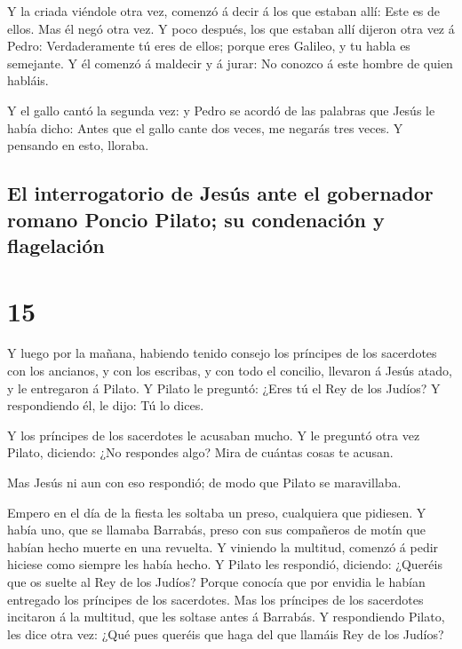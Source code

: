  Y la criada viéndole otra vez, comenzó á decir á los que
estaban allí: Este es de ellos.  Mas él negó otra vez. Y
poco después, los que estaban allí dijeron otra vez á Pedro:
Verdaderamente tú eres de ellos; porque eres Galileo, y tu habla es
semejante.  Y él comenzó á maldecir y á jurar: No conozco
á este hombre de quien habláis.

 Y el gallo cantó la segunda vez: y Pedro se acordó de
las palabras que Jesús le había dicho: Antes que el gallo cante dos
veces, me negarás tres veces. Y pensando en esto, lloraba.

\hypertarget{el-interrogatorio-de-jesuxfas-ante-el-gobernador-romano-poncio-pilato-su-condenaciuxf3n-y-flagelaciuxf3n}{%
\subsection{El interrogatorio de Jesús ante el gobernador romano Poncio
Pilato; su condenación y
flagelación}\label{el-interrogatorio-de-jesuxfas-ante-el-gobernador-romano-poncio-pilato-su-condenaciuxf3n-y-flagelaciuxf3n}}

\hypertarget{section-41-15}{%
\section{15}\label{section-41-15}}

 Y luego por la mañana, habiendo tenido consejo los
príncipes de los sacerdotes con los ancianos, y con los escribas, y con
todo el concilio, llevaron á Jesús atado, y le entregaron á Pilato.
 Y Pilato le preguntó: ¿Eres tú el Rey de los Judíos? Y
respondiendo él, le dijo: Tú lo dices.

 Y los príncipes de los sacerdotes le acusaban mucho.
 Y le preguntó otra vez Pilato, diciendo: ¿No respondes
algo? Mira de cuántas cosas te acusan.

 Mas Jesús ni aun con eso respondió; de modo que Pilato se
maravillaba.

 Empero en el día de la fiesta les soltaba un preso,
cualquiera que pidiesen.  Y había uno, que se llamaba
Barrabás, preso con sus compañeros de motín que habían hecho muerte en
una revuelta.  Y viniendo la multitud, comenzó á pedir
hiciese como siempre les había hecho.  Y Pilato les
respondió, diciendo: ¿Queréis que os suelte al Rey de los Judíos?
 Porque conocía que por envidia le habían entregado los
príncipes de los sacerdotes.  Mas los príncipes de los
sacerdotes incitaron á la multitud, que les soltase antes á Barrabás.
 Y respondiendo Pilato, les dice otra vez: ¿Qué pues
queréis que haga del que llamáis Rey de los Judíos?

